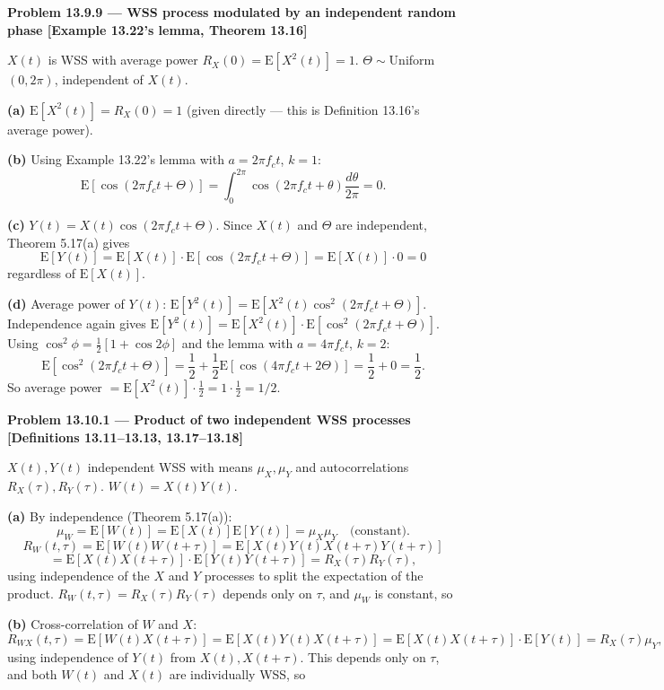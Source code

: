 \documentclass[11pt]{article}
\newcommand{\E}[1]{\mathrm{E}\left[#1\right]}
\newcommand{\topline}[1]{\par\vspace{5pt}\noindent{\color{#1}\rule{\linewidth}{1.1pt}}\par\vspace{3pt}}
\newcommand{\botline}[1]{\par\vspace{2pt}\noindent{\color{#1}\rule{\linewidth}{1.1pt}}\par\vspace{8pt}}
\newenvironment{examprob}[2]{%
  \topline{examcol}\noindent\textbf{\color{examcol}#1 --- #2}\par\smallskip\noindent\ignorespaces
}{\botline{examcol}}
\begin{document}
\begin{examprob}{Problem 13.9.9}{WSS process modulated by an independent random phase \hfill [Example 13.22's lemma, Theorem 13.16]}
$X(t)$ is WSS with average power $R_X(0)=\E{X^2(t)}=1$. $\Theta\sim$Uniform$(0,2\pi)$,
independent of $X(t)$.

\textbf{(a)} $\E{X^2(t)}=R_X(0)=\boxed{1}$ (given directly --- this is Definition 13.16's
average power).

\textbf{(b)} Using Example 13.22's lemma with $a=2\pi f_ct$, $k=1$:
\[ \E{\cos(2\pi f_ct+\Theta)} = \int_0^{2\pi}\cos(2\pi f_ct+\theta)\frac{d\theta}{2\pi} = \boxed{0}. \]

\textbf{(c)} $Y(t)=X(t)\cos(2\pi f_ct+\Theta)$. Since $X(t)$ and $\Theta$ are independent,
Theorem 5.17(a) gives
\[ \E{Y(t)} = \E{X(t)}\cdot\E{\cos(2\pi f_ct+\Theta)} = \E{X(t)}\cdot 0 = \boxed{0} \]
regardless of $\E{X(t)}$.

\textbf{(d)} Average power of $Y(t)$: $\E{Y^2(t)}=\E{X^2(t)\cos^2(2\pi f_ct+\Theta)}$.
Independence again gives $\E{Y^2(t)}=\E{X^2(t)}\cdot\E{\cos^2(2\pi f_ct+\Theta)}$. Using
$\cos^2\phi=\tfrac12[1+\cos2\phi]$ and the lemma with $a=4\pi f_ct$, $k=2$:
\[ \E{\cos^2(2\pi f_ct+\Theta)} = \frac12+\frac12\E{\cos(4\pi f_ct+2\Theta)} = \frac12+0 = \frac12. \]
So average power $=\E{X^2(t)}\cdot\tfrac12 = 1\cdot\tfrac12 = \boxed{1/2}$.
\end{examprob}

\begin{examprob}{Problem 13.10.1}{Product of two independent WSS processes \hfill [Definitions 13.11--13.13, 13.17--13.18]}
$X(t),Y(t)$ independent WSS with means $\mu_X,\mu_Y$ and autocorrelations $R_X(\tau),R_Y(\tau)$.
$W(t)=X(t)Y(t)$.

\textbf{(a)} By independence (Theorem 5.17(a)):
\[ \mu_W = \E{W(t)} = \E{X(t)}\E{Y(t)} = \mu_X\mu_Y \quad\text{(constant).} \]
\[
R_W(t,\tau) = \E{W(t)W(t+\tau)} = \E{X(t)Y(t)X(t+\tau)Y(t+\tau)}
\]
\[
= \E{X(t)X(t+\tau)}\cdot\E{Y(t)Y(t+\tau)} = R_X(\tau)R_Y(\tau),
\]
using independence of the $X$ and $Y$ processes to split the expectation of the product.
$R_W(t,\tau)=R_X(\tau)R_Y(\tau)$ depends only on $\tau$, and $\mu_W$ is constant, so

\textbf{(b)} Cross-correlation of $W$ and $X$:
\[
R_{WX}(t,\tau) = \E{W(t)X(t+\tau)} = \E{X(t)Y(t)X(t+\tau)} = \E{X(t)X(t+\tau)}\cdot\E{Y(t)}
= R_X(\tau)\mu_Y,
\]
using independence of $Y(t)$ from $X(t),X(t+\tau)$. This depends only on $\tau$, and both
$W(t)$ and $X(t)$ are individually WSS, so 
\end{examprob}
\end{document}
